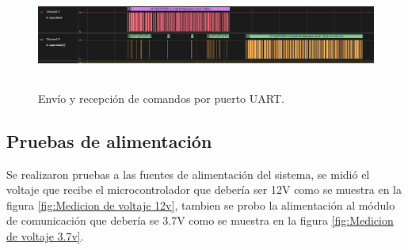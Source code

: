 \begin{figure}[h!]
  \centering
    \includegraphics[width=\linewidth, height=3.5cm]{./Figures/trama_uart1.png}
  \caption{Envío y recepción de comandos por puerto UART.}
    \label{fig:trama uart1}
\end{figure}

\subsection{Pruebas de alimentación }
Se realizaron pruebas a las fuentes de alimentación del sistema, se midió el voltaje que recibe el microcontrolador que debería ser 12V como se muestra en la figura  \ref{fig:Medicion de voltaje 12v}, tambien se probo la alimentación al módulo de comunicación que debería se 3.7V como se muestra en la figura \ref{fig:Medicion de voltaje 3.7v}.

